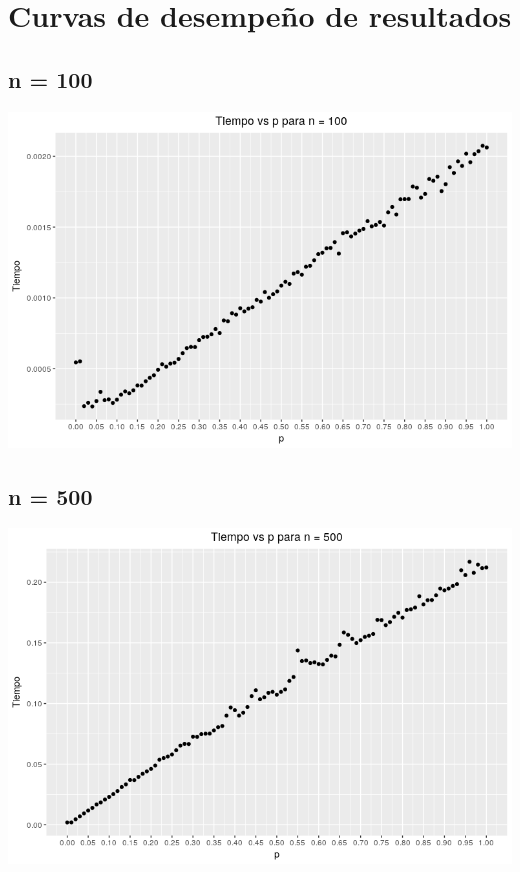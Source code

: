 \documentclass[12pt,letterpaper]{scrartcl}
\begin{document}
\section{Curvas de desempeño de resultados}

\subsection{n = 100}
\begin{center}
\includegraphics[scale=.80]{plots/plot1n100.png} 
\end{center}
\newpage
\subsection{n = 500}
\begin{center}
\includegraphics[scale=.80]{plots/plot2n500.png} 
\end{center}
\newpage
\end{document}
